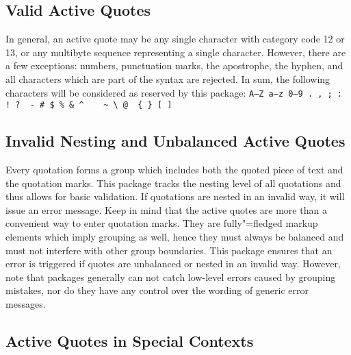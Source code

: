 \documentclass{ltxdockit}[2010/09/26]
\begin{document}
\subsection{Valid Active Quotes}
\label{hnt:val}

In general, an active quote may be any single character with category code 12 or 13, or any multibyte \utf sequence representing a single character. However, there are a few exceptions: numbers, punctuation marks, the apostrophe, the hyphen, and all characters which are part of the \latex syntax are rejected. In sum, the following characters will be considered as reserved by this package: \texttt{A--Z a--z 0--9 . , ; : ! ? \textquotesingle\ - \# \$ \% \& \textasciicircum\ \textunderscore\ \textasciigrave\, \textasciitilde\ \textbackslash\ @ \textasteriskcentered\ \{ \} [ ]}

\subsection{Invalid Nesting and Unbalanced Active Quotes}
\label{hnt:grp}

Every quotation forms a group which includes both the quoted piece of text and the quotation marks. This package tracks the nesting level of all quotations and thus allows for basic validation. If quotations are nested in an invalid way, it will issue an error message. Keep in mind that the active quotes are more than a convenient way to enter quotation marks. They are fully"=fledged markup elements which imply grouping as well, hence they must always be balanced and must not interfere with other group boundaries. This package ensures that an error is triggered if quotes are unbalanced or nested in an invalid way. However, note that packages generally can not catch low-level errors caused by grouping mistakes, nor do they have any control over the wording of generic error messages.

\subsection{Active Quotes in Special Contexts}
\label{hnt:mod}
\end{document}

